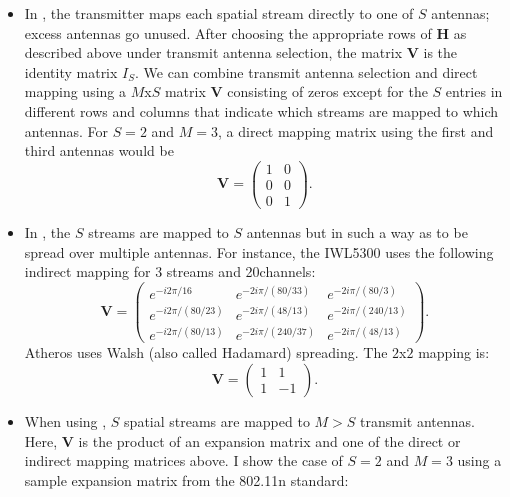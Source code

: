 \begin{itemize}[leftmargin=0.5cm,parsep=1ex,itemsep=1ex,topsep=1ex]
	\item In , the transmitter maps each spatial stream directly to one of $S$ antennas; excess antennas go unused. After choosing the appropriate rows of $\mathbf{H}$ as described above under transmit antenna selection, the matrix $\mathbf{V}$ is the identity matrix $I_S$. We can combine transmit antenna selection and direct mapping using a $M$x$S$ matrix $\mathbf{V}$ consisting of zeros except for the $S$ entries in different rows and columns that indicate which streams are mapped to which antennas. For $S=2$ and $M=3$, a direct mapping matrix using the first and third antennas would be
	\begin{equation*}
		\tag{Combined $3$x$2$ TX Antenna Selection and Direct Mapping}
		\mathbf{V} = \begin{pmatrix}
		1 & 0\\
		0 & 0\\
		0 & 1
		\end{pmatrix}.
	\end{equation*}
%
	\item In , the $S$ streams are mapped to $S$ antennas but in such a way as to be spread over multiple antennas. For instance, the IWL5300 uses the following indirect mapping for 3 streams and 20\MHz channels:
	\begin{equation*}
		\tag{IWL5300 $3$x$3$}
		\mathbf{V} = \begin{pmatrix}
		e^{-i2\pi/16} & e^{-2i\pi/(80/33)} & e^{-2i\pi/(80/3)} \\
		e^{-i2\pi/(80/23)} & e^{-2i\pi/(48/13)} & e^{-2i\pi/(240/13)} \\
		e^{-i2\pi/(80/13)} & e^{-2i\pi/(240/37)} & e^{-2i\pi/(48/13)}
		\end{pmatrix}.
	\end{equation*}
	Atheros uses Walsh (also called Hadamard) spreading. The $2$x$2$ mapping is:
	\begin{equation*}
		\tag{Atheros $2$x$2$}
		\mathbf{V} = \begin{pmatrix}
		1 & 1\\
		1 & -1
		\end{pmatrix}.
	\end{equation*}
%
	\item When using , $S$ spatial streams are mapped to $M > S$ transmit antennas. Here, $\mathbf{V}$ is the product of an expansion matrix and one of the direct or indirect mapping matrices above. I show the case of $S=2$ and $M=3$ using a sample expansion matrix from the 802.11n standard:

\end{itemize}
